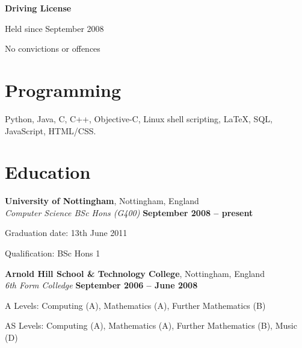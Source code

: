 \documentclass[margin,line]{resume}
\begin{document}
\begin{resume}
    \textbf{Driving License}\vspace{-4mm}\\%
    \begin{list2}
		\item Held since September 2008
		\item No convictions or offences
    \end{list2}
    
    \section{\mysidestyle Programming}

    Python, Java, C, C++, Objective-C, Linux shell scripting, \LaTeX, SQL, JavaScript, HTML/CSS.


    \section{\mysidestyle Education}

    \textbf{University of Nottingham}, Nottingham, England \vspace{2mm}\\\vspace{1mm}%
    \textsl{Computer Science BSc Hons (G400)} \hfill \textbf{September 2008 -- present}\vspace{-3mm}\\\vspace{-1mm}%
    \begin{list2}
        \item Graduation date: 13th June 2011%
        \item Qualification: BSc Hons 1
    \end{list2}\vspace{-1.5mm}
    
    \textbf{Arnold Hill School \& Technology College}, Nottingham, England \vspace{2mm}\\\vspace{1mm}%
    \textsl{6th Form Colledge} \hfill \textbf{September 2006 -- June 2008}\vspace{-3mm}\\\vspace{-1mm}%
    \begin{list2}
        \item A Levels: Computing (A), Mathematics (A), Further Mathematics (B)%
        \item AS Levels: Computing (A), Mathematics (A), Further Mathematics (B), Music (D)%
    \end{list2}\vspace{-1.5mm}



\end{resume}
\end{document}
